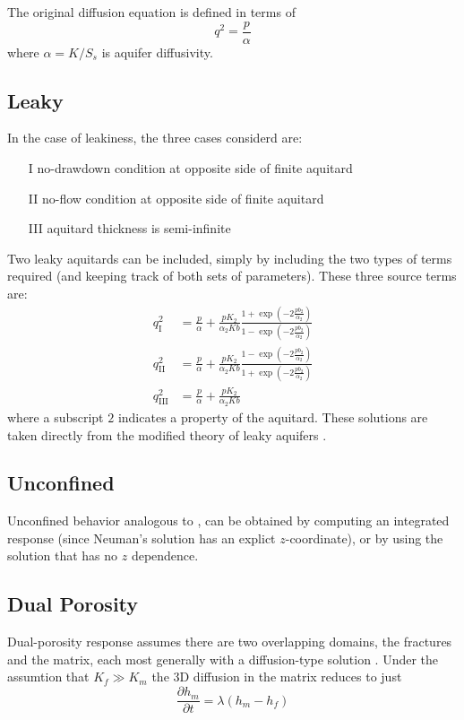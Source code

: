 \documentclass[12pt,letterpaper]{article}
\begin{document}
The original diffusion equation is defined in terms of 
\begin{equation}
  \label{eq:1}
  q^2 = \frac{p}{\alpha}
\end{equation}
where $\alpha=K/S_s$ is aquifer diffusivity.  

\subsection{Leaky}
In the case of leakiness, the three cases considerd are:
\begin{enumerate}
\item[I] no-drawdown condition at opposite side of finite aquitard
\item[II] no-flow condition at opposite side of finite aquitard
\item[III] aquitard thickness is semi-infinite
\end{enumerate}
Two leaky aquitards can be included, simply by including the two types
of terms required (and keeping track of both sets of parameters).
These three source terms are:
\begin{align}
  q_{\mathrm{I}}^2 &= \frac{p}{\alpha} + \frac{p K_2}{\alpha_2 Kb} \frac{1 + \exp\left(-2 \frac{p b_2}{\alpha_2}\right)}{1 - \exp\left(-2 \frac{p b_2}{\alpha_2}\right)} \\
  q_{\mathrm{II}}^2 &= \frac{p}{\alpha} + \frac{p K_2}{\alpha_2 Kb} \frac{1 - \exp\left(-2 \frac{p b_2}{\alpha_2}\right)}{1 + \exp\left(-2 \frac{p b_2}{\alpha_2}\right)} \\
  q_{\mathrm{III}}^2 &= \frac{p}{\alpha} + \frac{p K_2}{\alpha_2 Kb} 
\end{align}
where a subscript $2$ indicates a property of the aquitard.  These
solutions are taken directly from the modified theory of leaky
aquifers \cite{hantush1960modification}.

\subsection{Unconfined}
Unconfined behavior analogous to \cite{neuman1972theory}, can be
obtained by computing an integrated response (since Neuman's solution
has an explict $z$-coordinate), or by using the
\cite{boulton1954drawdown} solution that has no $z$ dependence.

\subsection{Dual Porosity}
Dual-porosity response assumes there are two overlapping domains, the
fractures and the matrix, each most generally with a diffusion-type
solution \cite{dougherty1984flow}.  Under the assumtion that $K_f \gg
K_m$ the 3D diffusion in the matrix reduces to just
\begin{equation}
  \label{eq:2}
  \frac{\partial h_m}{\partial t} = \lambda \left( h_m - h_f\right)
\end{equation}



\end{document}
